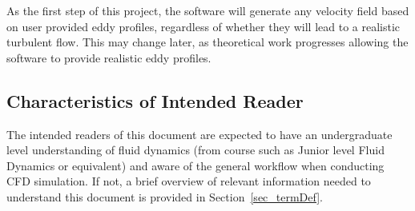 \documentclass[12pt]{article}
\begin{document}
As the first step of this project, the software will generate any velocity field based on user provided eddy profiles, regardless of whether they will lead to a realistic turbulent flow. This may change later, as theoretical work progresses allowing the software to provide realistic eddy profiles.




\subsection{Characteristics of Intended Reader} \label{sec_IntendedReader}

The intended readers of this document are expected to have an undergraduate level understanding of fluid dynamics (from course such as Junior level Fluid Dynamics or equivalent) and aware of the general workflow when conducting CFD simulation. If not, a brief overview of relevant information needed to understand this document is provided in Section~\ref{sec_termDef}.

\end{document}
